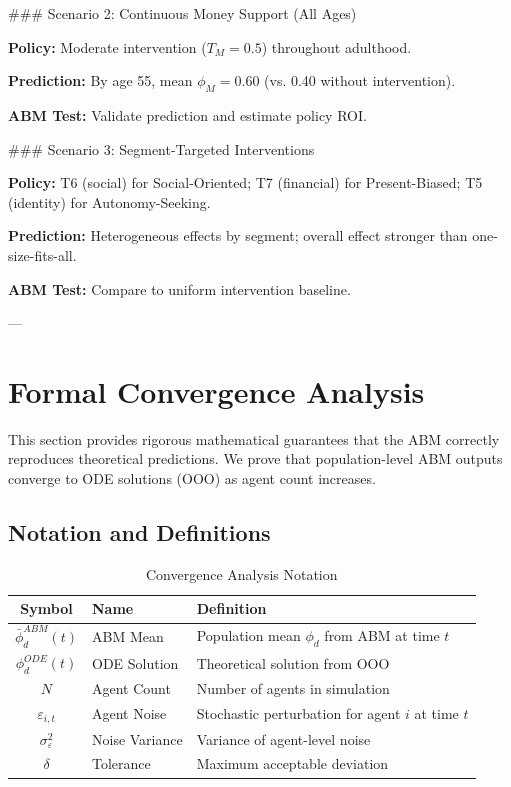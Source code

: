 ### Scenario 2: Continuous Money Support (All Ages)

\textbf{Policy:} Moderate intervention ($T_M = 0.5$) throughout adulthood.

\textbf{Prediction:} By age 55, mean $\phi_M = 0.60$ (vs. 0.40 without intervention).

\textbf{ABM Test:} Validate prediction and estimate policy ROI.

### Scenario 3: Segment-Targeted Interventions

\textbf{Policy:} T6 (social) for Social-Oriented; T7 (financial) for Present-Biased; T5 (identity) for Autonomy-Seeking.

\textbf{Prediction:} Heterogeneous effects by segment; overall effect stronger than one-size-fits-all.

\textbf{ABM Test:} Compare to uniform intervention baseline.

---


\section{Formal Convergence Analysis}
\label{ppp:convergence}

\begin{tcolorbox}[colback=blue!5!white, colframe=blue!75!black, title=Purpose]
This section provides rigorous mathematical guarantees that the ABM correctly
reproduces theoretical predictions. We prove that population-level ABM outputs
converge to ODE solutions (OOO) as agent count increases.
\end{tcolorbox}

\subsection{Notation and Definitions}

\begin{table}[htbp]
\centering
\caption{Convergence Analysis Notation}
\label{tab:ppp-convergence-notation}
\renewcommand{\arraystretch}{1.2}
\small
\begin{tabular}{@{}clp{6cm}@{}}
\toprule
\textbf{Symbol} & \textbf{Name} & \textbf{Definition} \\
\midrule
$\bar{\phi}^{ABM}_d(t)$ & ABM Mean & Population mean $\phi_d$ from ABM at time $t$ \\
$\phi^{ODE}_d(t)$ & ODE Solution & Theoretical solution from OOO \\
$N$ & Agent Count & Number of agents in simulation \\
$\varepsilon_{i,t}$ & Agent Noise & Stochastic perturbation for agent $i$ at time $t$ \\
$\sigma^2_\varepsilon$ & Noise Variance & Variance of agent-level noise \\
$\delta$ & Tolerance & Maximum acceptable deviation \\
\bottomrule
\end{tabular}
\end{table}

